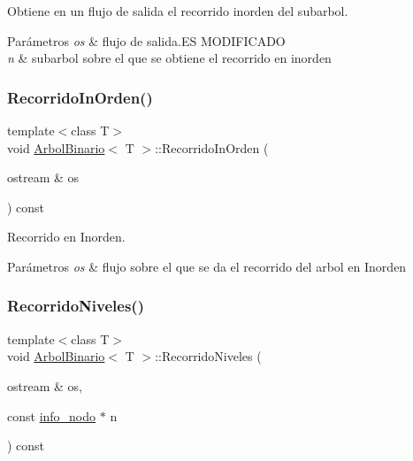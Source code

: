 Obtiene en un flujo de salida el recorrido inorden del subarbol. 


\begin{DoxyParams}{Parámetros}
{\em os} & flujo de salida.\+ES M\+O\+D\+I\+F\+I\+C\+A\+DO \\
\hline
{\em n} & subarbol sobre el que se obtiene el recorrido en inorden \\
\hline
\end{DoxyParams}
\mbox{\label{classArbolBinario_a717119bc343e038c8af7c00423c9b103}} 
\subsubsection{\texorpdfstring{Recorrido\+In\+Orden()}{RecorridoInOrden()}}
{\footnotesize\ttfamily template$<$class T$>$ \\
void \hyperlink{classArbolBinario}{Arbol\+Binario}$<$ T $>$\+::Recorrido\+In\+Orden (\begin{DoxyParamCaption}\item[{ostream \&}]{os }\end{DoxyParamCaption}) const}



Recorrido en Inorden. 


\begin{DoxyParams}{Parámetros}
{\em os} & flujo sobre el que se da el recorrido del arbol en Inorden \\
\hline
\end{DoxyParams}
\mbox{\label{classArbolBinario_a4030c86c360d2b07538ed03680d3fb89}} 
\subsubsection{\texorpdfstring{Recorrido\+Niveles()}{RecorridoNiveles()}\hspace{0.1cm}{\footnotesize\ttfamily [1/2]}}
{\footnotesize\ttfamily template$<$class T$>$ \\
void \hyperlink{classArbolBinario}{Arbol\+Binario}$<$ T $>$\+::Recorrido\+Niveles (\begin{DoxyParamCaption}\item[{ostream \&}]{os,  }\item[{const \hyperlink{structArbolBinario_1_1info__nodo}{info\+\_\+nodo} $\ast$}]{n }\end{DoxyParamCaption}) const\hspace{0.3cm}{\ttfamily [private]}}



